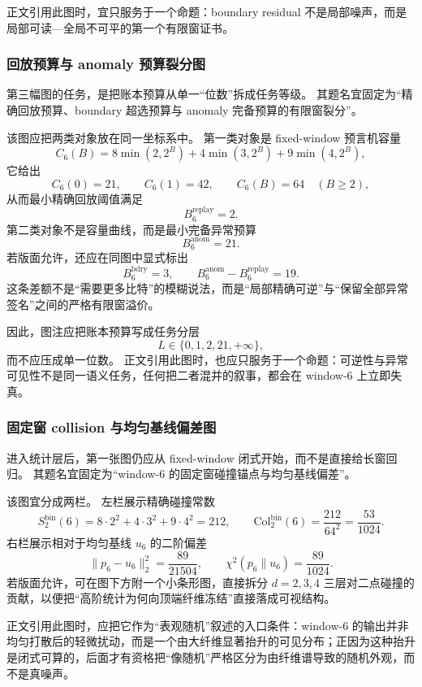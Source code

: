 正文引用此图时，宜只服务于一个命题：boundary residual 不是局部噪声，而是局部可读—全局不可平的第一个有限窗证书。

\subsubsection{回放预算与 anomaly 预算裂分图}\label{subsubsec:typed-address-biaxial-completion-window6-figure-budget-split}
第三幅图的任务，是把账本预算从单一“位数”拆成任务等级。
其题名宜固定为“精确回放预算、boundary 超选预算与 anomaly 完备预算的有限窗裂分”。

该图应把两类对象放在同一坐标系中。
第一类对象是 fixed-window 预言机容量
\[
C_6(B)=8\min(2,2^B)+4\min(3,2^B)+9\min(4,2^B),
\]
它给出
\[
C_6(0)=21,
\qquad
C_6(1)=42,
\qquad
C_6(B)=64\quad(B\ge 2),
\]
从而最小精确回放阈值满足
\[
B_6^{\mathrm{replay}}=2.
\]
第二类对象不是容量曲线，而是最小完备异常预算
\[
B_6^{\mathrm{anom}}=21.
\]
若版面允许，还应在同图中显式标出
\[
B_6^{\mathrm{bdry}}=3,
\qquad
B_6^{\mathrm{anom}}-B_6^{\mathrm{replay}}=19.
\]
这条差额不是“需要更多比特”的模糊说法，而是“局部精确可逆”与“保留全部异常签名”之间的严格有限窗溢价。

因此，图注应把账本预算写成任务分层
\[
L\in\{0,1,2,21,+\infty\},
\]
而不应压成单一位数。
正文引用此图时，也应只服务于一个命题：可逆性与异常可见性不是同一语义任务，任何把二者混并的叙事，都会在 window-\(6\) 上立即失真。

\subsubsection{固定窗 collision 与均匀基线偏差图}\label{subsubsec:typed-address-biaxial-completion-window6-figure-fixed-window-collision}
进入统计层后，第一张图仍应从 fixed-window 闭式开始，而不是直接给长窗回归。
其题名宜固定为“window-\(6\) 的固定窗碰撞锚点与均匀基线偏差”。

该图宜分成两栏。
左栏展示精确碰撞常数
\[
S_2^{\mathrm{bin}}(6)=8\cdot 2^2+4\cdot 3^2+9\cdot 4^2=212,
\qquad
\mathrm{Col}_2^{\mathrm{bin}}(6)=\frac{212}{64^2}=\frac{53}{1024}.
\]
右栏展示相对于均匀基线 \(u_6\) 的二阶偏差
\[
\|p_6-u_6\|_2^2=\frac{89}{21504},
\qquad
\chi^2(p_6\|u_6)=\frac{89}{1024}.
\]
若版面允许，可在图下方附一个小条形图，直接拆分 \(d=2,3,4\) 三层对二点碰撞的贡献，以便把“高阶统计为何向顶端纤维冻结”直接落成可视结构。

正文引用此图时，应把它作为“表观随机”叙述的入口条件：window-\(6\) 的输出并非均匀打散后的轻微扰动，而是一个由大纤维显著抬升的可见分布；正因为这种抬升是闭式可算的，后面才有资格把“像随机”严格区分为由纤维谱导致的随机外观，而不是真噪声。

